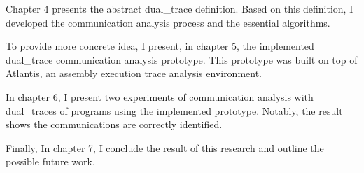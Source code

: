 Chapter 4 presents the abstract dual\_trace definition. Based on this definition, I developed the communication analysis process and the essential algorithms.

To provide more concrete idea, I present, in chapter 5, the implemented dual\_trace communication analysis prototype. This prototype was built on top of Atlantis\cite{huang2017atlantis}, an assembly execution trace analysis environment.

In chapter 6, I present two experiments of communication analysis with dual\_traces of programs using the implemented prototype. Notably, the result shows the communications are correctly identified. 

Finally, In chapter 7, I conclude the result of this research and outline the possible future work.